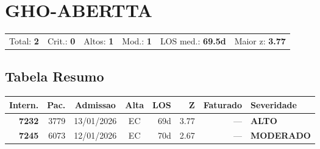 \documentclass[a4paper,10pt]{article}
\begin{document}
\clearpage
\section{GHO-ABERTTA}
\begin{tcolorbox}[colback=lightblue,colframe=jcubeblue,title={\textbf{Resumo --- GHO-ABERTTA}}]
\begin{tabular}{ll@{\quad}ll@{\quad}ll}
Total: \textbf{2} &
Crit.: \textcolor{anomred}{\textbf{0}} &
Altos: \textcolor{anomorange}{\textbf{1}} &
Mod.: \textcolor{anomyellow}{\textbf{1}} &
LOS med.: \textbf{69.5d} &
Maior z: \textbf{3.77} \\


\end{tabular}
\end{tcolorbox}

\subsection{Tabela Resumo}
\begin{center}
\begin{longtable}{>{\scriptsize}r>{\scriptsize}r>{\scriptsize}c>{\scriptsize}c>{\scriptsize}r>{\scriptsize}r>{\scriptsize}r>{\scriptsize}l}
\toprule
\textbf{Intern.} & \textbf{Pac.} & \textbf{Admissao} & \textbf{Alta} & \textbf{LOS} & \textbf{Z} & \textbf{Faturado} & \textbf{Severidade} \\
\midrule
\endhead
\bottomrule
\endfoot

\textcolor{anomorange}{\textbf{7232}} & 3779 & 13/01/2026 & \textcolor{anomorange}{EC} & 69d & \textcolor{anomorange}{3.77} & --- & \textcolor{anomorange}{\textbf{ALTO}} \\

\textcolor{anomyellow}{\textbf{7245}} & 6073 & 12/01/2026 & \textcolor{anomorange}{EC} & 70d & \textcolor{anomyellow}{2.67} & --- & \textcolor{anomyellow}{\textbf{MODERADO}} \\

\end{longtable}\end{center}
\end{document}
